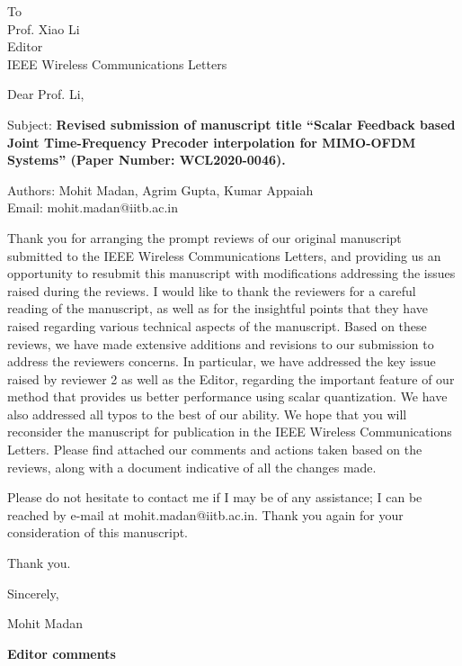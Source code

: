 \documentclass[12pt]{letter}
\date{\today}
\begin{document}
\begin{letter}{To\\
Prof. Xiao Li\\
Editor\\
IEEE Wireless Communications Letters}
\vspace{0.5in}


\opening{Dear Prof. Li,}

Subject: \textbf{Revised submission of manuscript title ``Scalar
  Feedback based Joint Time-Frequency Precoder interpolation for  MIMO-OFDM Systems'' (Paper Number: WCL2020-0046).}

Authors: Mohit Madan, Agrim Gupta, Kumar Appaiah\\
Email: mohit.madan@iitb.ac.in

Thank you for arranging the prompt reviews of our original manuscript
submitted to the IEEE Wireless Communications Letters, and providing
us an opportunity to resubmit this manuscript with modifications
addressing the issues raised during the reviews. I would like to thank
the reviewers for a careful reading of the manuscript, as well as for
the insightful points that they have raised regarding various
technical aspects of the manuscript. Based on these reviews, we have
made extensive additions and revisions to our submission to address
the reviewers concerns. In particular, we have addressed the key issue
raised by reviewer 2 as well as the Editor, regarding the important
feature of our method that provides us better performance using scalar
quantization. We have also addressed all typos to the best of our
ability. We hope that you will reconsider the manuscript for
publication in the IEEE Wireless Communications Letters. Please find
attached our comments and actions taken based on the reviews, along
with a document indicative of all the changes made.

Please do not hesitate to contact me if I may be of any assistance; I
can be reached by e-mail at mohit.madan@iitb.ac.in. Thank you again
for your consideration of this manuscript.


Thank you.
\vspace{0.3in}

Sincerely,

Mohit Madan



\end{letter}

\newpage

\textbf{Editor comments}\\
\end{document}
